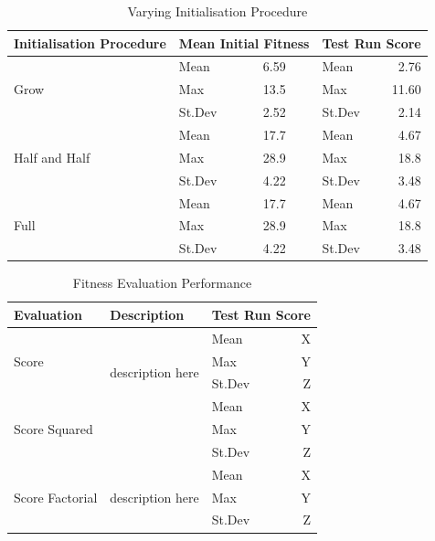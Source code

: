 \documentclass{article}
\begin{document}
\begin{table}[h]
\begin{center}
\begin{tabular}{|l|l|l|l|r|}
\hline%
\textbf{Initialisation Procedure} & \multicolumn{2}{c|}{\textbf{Mean Initial Fitness}} & \multicolumn{2}{c|}{\textbf{Test Run Score}} \\
\hline
\multirow{3}{*}{Grow}
& Mean & 6.59 & Mean & 2.76 \\
& Max & 13.5 & Max & 11.60 \\
& St.Dev & 2.52 & St.Dev & 2.14 \\
\hline
\multirow{3}{*}{Half and Half}
& Mean & 17.7 & Mean & 4.67 \\
& Max & 28.9 & Max & 18.8 \\
& St.Dev & 4.22 & St.Dev & 3.48 \\
\hline
\multirow{3}{*}{Full}
& Mean & 17.7 & Mean & 4.67 \\
& Max & 28.9 & Max & 18.8 \\
& St.Dev & 4.22 & St.Dev & 3.48 \\
\hline
\end{tabular}
\end{center}
\caption{Varying Initialisation Procedure}
\label{table:initialisation}
\end{table}


\begin{table}[h]
\begin{center}
\begin{tabular}{|l|l|l|r|}
\hline%
\textbf{Evaluation} & \textbf{Description} & \multicolumn{2}{c|}{\textbf{Test Run Score}} \\
\hline
\multirow{3}{*}{Score} & \multirow{4}{*}{description here}
& Mean & X \\
&& Max  & Y \\
&& St.Dev & Z \\
\hline
\multirow{3}{*}{Score Squared} & \multirow{4}{*}{description here}
& Mean & X \\
&& Max  & Y \\
&& St.Dev & Z \\
\hline
\multirow{3}{*}{Score Factorial} & \multirow{4}{*}{description here}
& Mean & X \\
&& Max  & Y \\
&& St.Dev & Z \\
\hline
\end{tabular}
\end{center}
\caption{Fitness Evaluation Performance}
\label{table:function_set}
\end{table}
\end{document}
